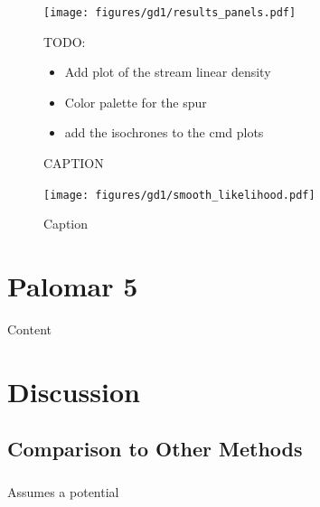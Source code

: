 \documentclass[twocolumn]{aastex631}
\begin{document}
        \begin{figure}[h]
            \centering
            \texttt{[image: figures/gd1/results\_panels.pdf]}
            \caption{CAPTION}
            TODO:
            \begin{itemize}
                \item Add plot of the stream linear density
                \item Color palette for the spur
                \item add the isochrones to the cmd plots
            \end{itemize}
            \label{fig:gd1-results-panels}
        \end{figure}

        \begin{figure}
            \centering
            \texttt{[image: figures/gd1/smooth\_likelihood.pdf]}
            \caption{Caption}
            \label{fig:gd1-heatmap}
        \end{figure}




\section{Palomar 5} \label{sec:results_pal5}

    Content



\section{Discussion}


    \subsection{Comparison to Other Methods} \label{sec:comparison}

        \subsubsection[STREAMFINDER]{\cite{2018MNRAS.477.4063M}}
    
            Assumes a potential
    
\end{document}
